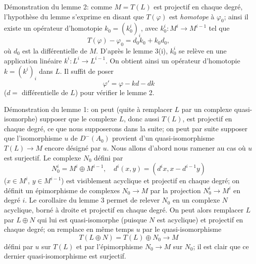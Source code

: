 \documentclass[11pt]{article}
\begin{document}
Démonstration du lemme 2: comme $M=T(L)$ est projectif en chaque degré, l'hypothèse du lemme s'exprime en disant que $T(\varphi)$ est \emph{homotope} à $\varphi_0$; ainsi il existe un opérateur d'homotopie $k_0=(k_0^i)_i$, avec $k_0^i:M^i\to M^{i-1}$ tel que
\[
T(\varphi)-\varphi_0=d_0k_0+k_0d_0,
\]
où $d_0$ est la différentielle de $M$. D'après le lemme 3(i), $k_0^i$ se relève en une application linéaire $k^i:L^i\to L^{i-1}$. On obtient ainsi un opérateur d'homotopie $k=(k^i)_i$ dans $L$. Il suffit de poser
\[
\varphi'=\varphi-kd-dk
\]
($d=$ différentielle de $L$) pour vérifier le lemme 2.

Démonstration du lemme 1: on peut (quite à remplacer $L$ par un complexe quasi-isomorphe) supposer que le complexe $L$, donc aussi $T(L)$, 
est
projectif en chaque degré, ce que nous supposerons dans la suite; on peut par suite supposer que l'isomorphisme $u$ de $D^-(A_0)$ provient d'un quasi-isomorphisme $T(L)\to M$ encore désigné par $u$. Nous allons d'abord nous ramener au cas où $u$ est surjectif. Le complexe $N_0$ défini par
\[
N_0^i=M^i\oplus M^{i-1},
\quad
 d^i(x,y)=(d^i x,x-d^{i-1}y)
\]
($x\in M^i$, $y\in M^{i-1}$) est visiblement acyclique et projectif en chaque degré; on définit un épimorphisme de complexes $N_0\to M$ par la projection $N_0^i\to M^i$ en degré $i$. Le corollaire du lemme 3 permet de relever $N_0$ en un complexe $N$ acyclique, borné à droite et projectif en chaque degré. On peut alors remplacer $L$ par $L\oplus N$ qui lui est quasi-isomorphe (puisque $N$ est acyclique) et projectif en chaque degré; on remplace en même temps $u$ par le quasi-isomorphisme
\[
T(L\oplus N)=T(L)\oplus N_0\longrightarrow M
\]
défini par $u$ sur $T(L)$ et par l'épimorphisme $N_0\to M$ sur $N_0$; il est clair que ce dernier quasi-isomorphisme est surjectif.
\end{document}
